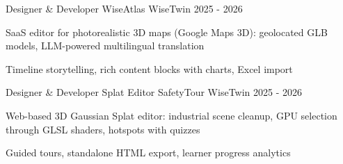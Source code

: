 


\begin{cventries}


\cventry
{Designer \& Developer} %
{WiseAtlas} %
{WiseTwin} %
{2025 - 2026} %
{ %
\begin{cvitems}
\item {SaaS editor for photorealistic 3D maps (Google Maps 3D): geolocated GLB models, LLM-powered multilingual translation}
\item {Timeline storytelling, rich content blocks with charts, Excel import}
\end{cvitems}
}
\vspace{1em}


\cventry
{Designer \& Developer} %
{Splat Editor SafetyTour} %
{WiseTwin} %
{2025 - 2026} %
{ %
\begin{cvitems}
\item {Web-based 3D Gaussian Splat editor: industrial scene cleanup, GPU selection through GLSL shaders, hotspots with quizzes}
\item {Guided tours, standalone HTML export, learner progress analytics}
\end{cvitems}
}


\end{cventries}

